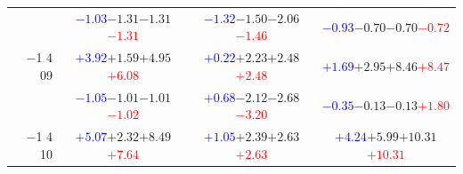 \documentclass[compress]{beamer}
\begin{document}
\begin{frame}
\begin{tabular}{r | c | c | c}
          & \textcolor{blue}{$-1.03$}\hspace{0.1 cm}$-1.31$\hspace{0.1 cm}$-1.31$\hspace{0.1 cm}\textcolor{red}{$-1.31$} & \textcolor{blue}{$-1.32$}\hspace{0.1 cm}$-1.50$\hspace{0.1 cm}$-2.06$\hspace{0.1 cm}\textcolor{red}{$-1.46$} & \textcolor{blue}{$-0.93$}\hspace{0.1 cm}$-0.70$\hspace{0.1 cm}$-0.70$\hspace{0.1 cm}\textcolor{red}{$-0.72$} \\
$-$1 4 09 & \textcolor{blue}{$+3.92$}\hspace{0.1 cm}$+1.59$\hspace{0.1 cm}$+4.95$\hspace{0.1 cm}\textcolor{red}{$+6.08$} & \textcolor{blue}{$+0.22$}\hspace{0.1 cm}$+2.23$\hspace{0.1 cm}$+2.48$\hspace{0.1 cm}\textcolor{red}{$+2.48$} & \textcolor{blue}{$+1.69$}\hspace{0.1 cm}$+2.95$\hspace{0.1 cm}$+8.46$\hspace{0.1 cm}\textcolor{red}{$+8.47$} \\
          & \textcolor{blue}{$-1.05$}\hspace{0.1 cm}$-1.01$\hspace{0.1 cm}$-1.01$\hspace{0.1 cm}\textcolor{red}{$-1.02$} & \textcolor{blue}{$+0.68$}\hspace{0.1 cm}$-2.12$\hspace{0.1 cm}$-2.68$\hspace{0.1 cm}\textcolor{red}{$-3.20$} & \textcolor{blue}{$-0.35$}\hspace{0.1 cm}$-0.13$\hspace{0.1 cm}$-0.13$\hspace{0.1 cm}\textcolor{red}{$+1.80$} \\
$-$1 4 10 & \textcolor{blue}{$+5.07$}\hspace{0.1 cm}$+2.32$\hspace{0.1 cm}$+8.49$\hspace{0.1 cm}\textcolor{red}{$+7.64$} & \textcolor{blue}{$+1.05$}\hspace{0.1 cm}$+2.39$\hspace{0.1 cm}$+2.63$\hspace{0.1 cm}\textcolor{red}{$+2.63$} & \textcolor{blue}{$+4.24$}\hspace{0.1 cm}$+5.99$\hspace{0.1 cm}$+10.31$\hspace{0.1 cm}\textcolor{red}{$+10.31$} \\

\end{tabular}
\end{frame}
\end{document}
